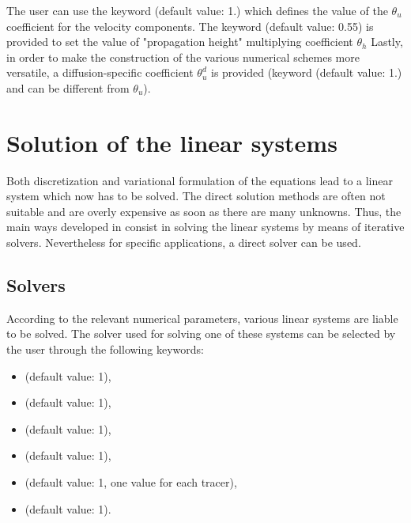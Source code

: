 The user can use the keyword  (default
value: 1.) which defines the value of the $\theta_{u}$ coefficient for the
velocity components. The keyword  (default
value: 0.55) is provided to set the value of "propagation height" multiplying
coefficient $\theta_{h}$ Lastly, in order to make the construction of the
various numerical schemes more versatile, a diffusion-specific coefficient
$\theta_{u}^{d}$ is provided (keyword 
(default value: 1.) and can be different from $\theta_{u}$).


\section{Solution of the linear systems}

Both discretization and variational formulation of the equations lead to a
linear system which now has to be solved. The direct solution methods are often
not suitable and are overly expensive as soon as there are many unknowns.
Thus, the main ways developed in  consist in solving the linear
systems by means of iterative solvers. Nevertheless for specific applications,
a direct solver can be used.


\subsection{Solvers}
\label{sec:solver}
According to the relevant numerical parameters, various linear systems are
liable to be solved. The solver used for solving one of these systems can be
selected by the user through the following keywords:

\begin{itemize}
\item {} (default value: 1),

\item {} (default value: 1),

\item {} (default value: 1),

\item {} (default value: 1),

\item {} (default value: 1, one value for
each tracer),

\item {}(default value: 1).
\end{itemize}

